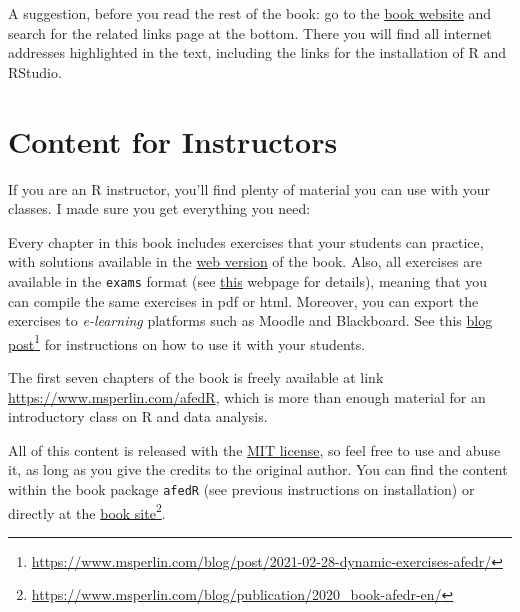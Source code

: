 \documentclass[
  12pt,
]{book}
\providecommand{\tightlist}{%
  \setlength{\itemsep}{0pt}\setlength{\parskip}{0pt}}
\begin{document}
A suggestion, before you read the rest of the book: go to the \href{https://www.msperlin.com/blog/publication/2020_book-afedr-en/}{book website} and search for the related links page at the bottom. There you will find all internet addresses highlighted in the text, including the links for the installation of R and RStudio.

\hypertarget{content-for-instructors}{%
\section*{Content for Instructors}\label{content-for-instructors}}

If you are an R instructor, you'll find plenty of material you can use with your classes. I made sure you get everything you need:

\begin{description}
\tightlist
\item[Over 100 exercises]
Every chapter in this book includes exercises that your students can practice, with solutions available in the \href{https://www.msperlin.com/afedR}{web version} of the book. Also, all exercises are available in the \texttt{exams} format (see \href{http://www.r-exams.org/}{this} webpage for details), meaning that you can compile the same exercises in pdf or html. Moreover, you can export the exercises to \emph{e-learning} platforms such as Moodle and Blackboard. See this \href{https://www.msperlin.com/blog/post/2021-02-28-dynamic-exercises-afedr/}{blog post}\footnote{\url{https://www.msperlin.com/blog/post/2021-02-28-dynamic-exercises-afedr/}} for instructions on how to use it with your students.
\item[Web version]
The first seven chapters of the book is freely available at link \url{https://www.msperlin.com/afedR}, which is more than enough material for an introductory class on R and data analysis.
\end{description}

All of this content is released with the \href{https://opensource.org/licenses/MIT}{MIT license}, so feel free to use and abuse it, as long as you give the credits to the original author. You can find the content within the book package \texttt{afedR} (see previous instructions on installation) or directly at the \href{https://www.msperlin.com/blog/publication/2020_book-afedr-en/}{book site}\footnote{\url{https://www.msperlin.com/blog/publication/2020_book-afedr-en/}}.
\end{document}
